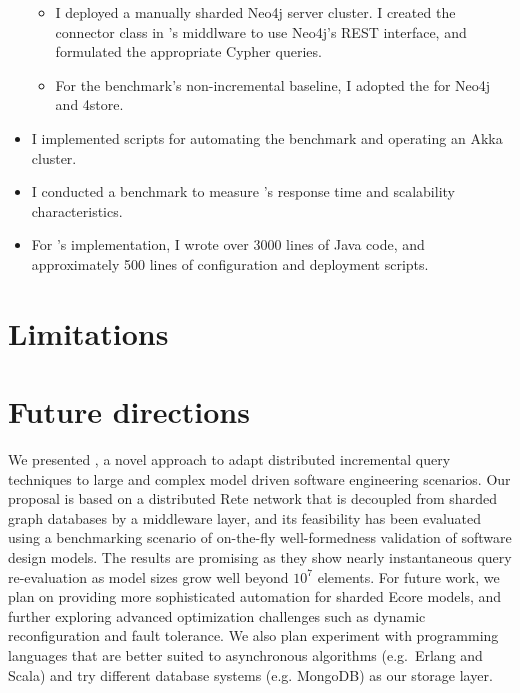 \begin{itemize}
\begin{itemize}
    \item I deployed a manually sharded Neo4j server cluster. I created the connector class in \iqd{}'s middlware to use Neo4j's REST interface, and formulated the appropriate Cypher queries.
    \item For the benchmark's non-incremental baseline, I adopted the \tb{} for Neo4j and 4store. 
  \end{itemize}
  \item I implemented scripts for automating the benchmark and operating an Akka cluster.
  \item I conducted a benchmark to measure \iqd{}'s response time and scalability characteristics.
  \item For \iqd{}'s implementation, I wrote over 3000 lines of Java code, and approximately 500 lines of configuration and deployment scripts.
\end{itemize}

\section{Limitations}

\section{Future directions}

We presented \iqd{}, a novel approach to adapt distributed incremental query techniques to large and complex model driven software engineering scenarios. Our proposal is based on a distributed Rete network that is decoupled from sharded graph databases by a middleware layer, and its feasibility has been evaluated using a benchmarking scenario of on-the-fly well-formedness validation of software design models. The results are promising as they show nearly instantaneous query re-evaluation as model sizes grow well beyond $10^7$ elements.
For future work, we plan on providing more sophisticated automation for sharded Ecore models, and further exploring advanced optimization challenges such as dynamic reconfiguration and fault tolerance.
We also plan experiment with programming languages that are better suited to asynchronous algorithms (e.g.\ Erlang and Scala) and try different database systems (e.g. MongoDB) as our storage layer.


